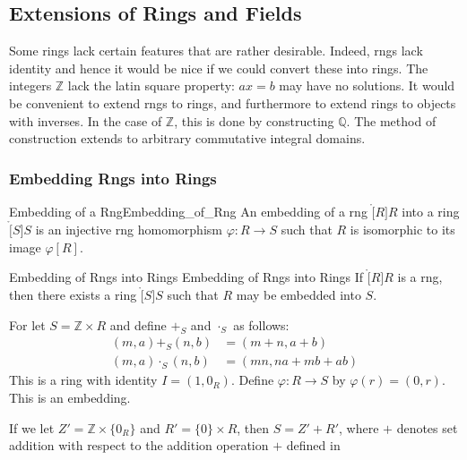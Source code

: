     \subsection{Extensions of Rings and Fields}
        Some rings lack certain features that are rather desirable. Indeed,
        rngs lack identity and hence it would be nice if we could convert
        these into rings. The integers $\mathbb{Z}$ lack the latin square
        property: $ax=b$ may have no solutions. It would be convenient to
        extend rngs to rings, and furthermore to extend rings to objects
        with inverses. In the case of $\mathbb{Z}$, this is done by
        constructing $\mathbb{Q}$. The method of construction extends to
        arbitrary commutative integral domains.
        \subsubsection{Embedding Rngs into Rings}
            \begin{fdefinition}{Embedding of a Rng}{Embedding_of_Rng}
                An embedding of a rng $\ring[R]{R}$ into a ring
                $\ring[S]{S}$ is an injective rng homomorphism
                $\varphi:R\rightarrow{S}$ such that $R$ is isomorphic to its
                image $\varphi[R]$.
            \end{fdefinition}
            \begin{ftheorem}{Embedding of Rngs into Rings}
                            {Embedding of Rngs into Rings}
                If $\ring[R]{R}$ is a rng, then there exists a ring
                $\ring[S]{S}$ such that $R$ may be embedded into $S$.
            \end{ftheorem}
            \begin{bproof}
                For let $S=\mathbb{Z}\times{R}$ and define $+_{S}$ and
                $\cdot_{S}$ as follows:
                \begin{align}
                    (m,a)+_{S}(n,b)&=(m+n,a+b)\\
                    (m,a)\cdot_{S}(n,b)&=(mn,na+mb+ab)
                \end{align}
                This is a ring with identity $I=(1,0_{R})$. Define
                $\varphi:R\rightarrow{S}$ by $\varphi(r)=(0,r)$. This is an
                embedding.
            \end{bproof}
            If we let $Z'=\mathbb{Z}\times\{0_{R}\}$ and
            $R'=\{0\}\times{R}$, then $S=Z'+R'$, where $+$ denotes set
            addition with respect to the addition operation $+$ defined in
